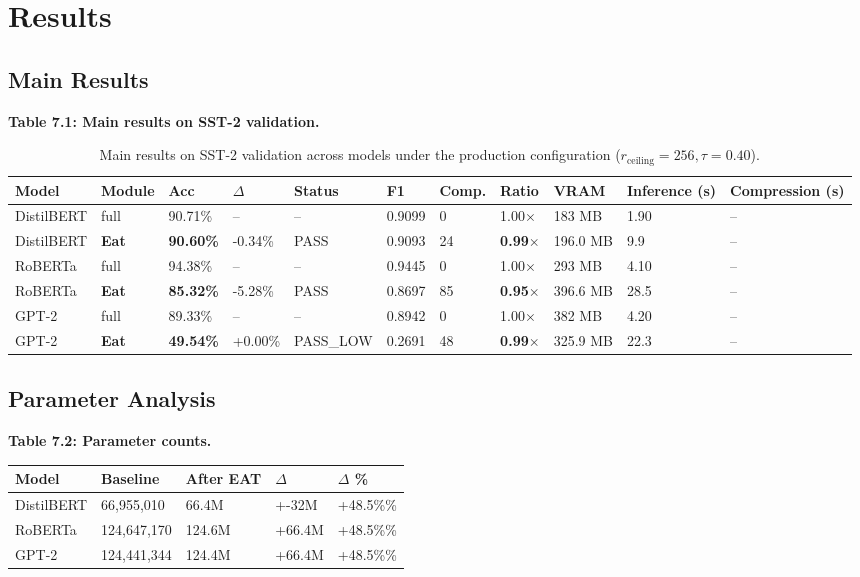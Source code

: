 
\section{Results}

\subsection{Main Results}

\textbf{Table 7.1: Main results on SST-2 validation.}

\begin{table}[t]
\centering
\small
\begin{tabular}{lllllllllll}
\toprule
\textbf{Model} & \textbf{Module} & \textbf{Acc} & \textbf{$\Delta$} & \textbf{Status} & \textbf{F1} & \textbf{Comp.} & \textbf{Ratio} & \textbf{VRAM} & \textbf{Inference (s)} & \textbf{Compression (s)} \\
\midrule
DistilBERT & full & 90.71\% & -- & -- & 0.9099 & 0 & 1.00$\times$ & 183 MB & 1.90 & -- \\
DistilBERT & \textbf{Eat} & \textbf{90.60\%} & -0.34\% & PASS & 0.9093 & 24 & \textbf{0.99$\times$} & 196.0 MB & 9.9 & -- \\
RoBERTa & full & 94.38\% & -- & -- & 0.9445 & 0 & 1.00$\times$ & 293 MB & 4.10 & -- \\
RoBERTa & \textbf{Eat} & \textbf{85.32\%} & -5.28\% & PASS & 0.8697 & 85 & \textbf{0.95$\times$} & 396.6 MB & 28.5 & -- \\
GPT-2 & full & 89.33\% & -- & -- & 0.8942 & 0 & 1.00$\times$ & 382 MB & 4.20 & -- \\
GPT-2 & \textbf{Eat} & \textbf{49.54\%} & +0.00\% & PASS\_LOW & 0.2691 & 48 & \textbf{0.99$\times$} & 325.9 MB & 22.3 & -- \\
\bottomrule
\end{tabular}
\caption{Main results on SST-2 validation across models under the production configuration ($r_{\mathrm{ceiling}}=256, \tau=0.40$).}
\label{tab:main_sst2}
\end{table}

\subsection{Parameter Analysis}

\textbf{Table 7.2: Parameter counts.}

\begin{table}[H]
\centering
\small
\begin{tabular}{lllll}
\toprule
\textbf{Model} & \textbf{Baseline} & \textbf{After EAT} & \textbf{$\Delta$} & \textbf{$\Delta$ \%} \\
\midrule
DistilBERT & 66,955,010 & 66.4M & +-32M & +48.5\%\% \\
RoBERTa & 124,647,170 & 124.6M & +66.4M & +48.5\%\% \\
GPT-2 & 124,441,344 & 124.4M & +66.4M & +48.5\%\% \\
\bottomrule
\end{tabular}
\end{table}


